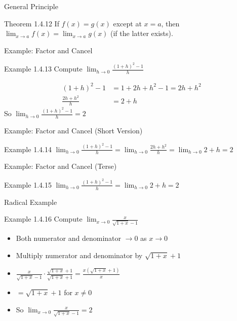 \documentclass[aspectratio=169]{beamer}
\newcommand{\limx}[2]{\lim_{x \to #1} #2}
\begin{document}
\begin{frame}{General Principle}
\begin{block}{Theorem 1.4.12}
If $f(x) = g(x)$ except at $x=a$, then $\limx{a}{f(x)} = \limx{a}{g(x)}$ (if the latter exists).
\end{block}
\end{frame}

\begin{frame}{Example: Factor and Cancel}
\begin{block}{Example 1.4.13}
Compute $\lim_{h \to 0} \frac{(1+h)^2-1}{h}$
\end{block}
\begin{align*}
  (1+h)^2-1 &= 1+2h+h^2-1 = 2h+h^2 \\
  \frac{2h+h^2}{h} &= 2+h
\end{align*}
So $\lim_{h \to 0} \frac{(1+h)^2-1}{h} = 2$
\end{frame}

\begin{frame}{Example: Factor and Cancel (Short Version)}
\begin{block}{Example 1.4.14}
$\lim_{h \to 0} \frac{(1+h)^2-1}{h} = \lim_{h \to 0} \frac{2h+h^2}{h} = \lim_{h \to 0} 2+h = 2$
\end{block}
\end{frame}

\begin{frame}{Example: Factor and Cancel (Terse)}
\begin{block}{Example 1.4.15}
$\lim_{h \to 0} \frac{(1+h)^2-1}{h} = \lim_{h \to 0} 2+h = 2$
\end{block}
\end{frame}

\begin{frame}{Radical Example}
\begin{block}{Example 1.4.16}
Compute $\limx{0}{\frac{x}{\sqrt{1+x}-1}}$
\end{block}
\begin{itemize}
  \item Both numerator and denominator $\to 0$ as $x \to 0$
  \item Multiply numerator and denominator by $\sqrt{1+x}+1$
  \item $\frac{x}{\sqrt{1+x}-1} \cdot \frac{\sqrt{1+x}+1}{\sqrt{1+x}+1} = \frac{x(\sqrt{1+x}+1)}{x}$
  \item $= \sqrt{1+x}+1$ for $x \neq 0$
  \item So $\limx{0}{\frac{x}{\sqrt{1+x}-1}} = 2$
\end{itemize}
\end{frame}
\end{document}

